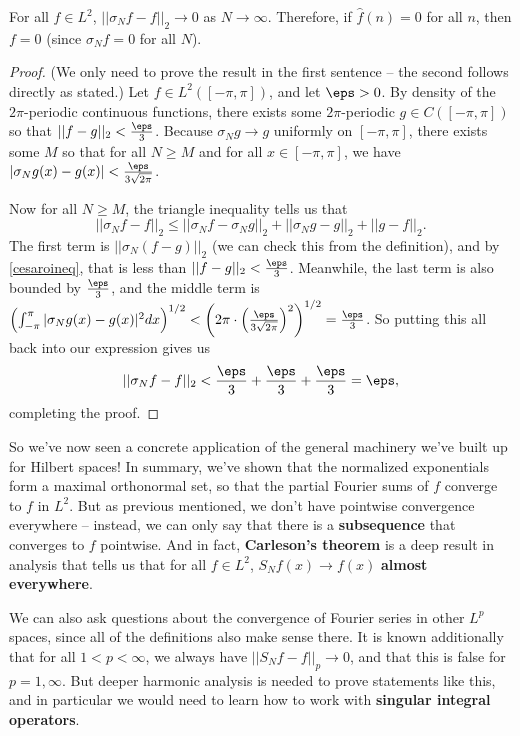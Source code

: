\begin{theorem}
For all $f \in L^2$, $||\sigma_N f - f||_2 \to 0$ as $N \to \infty$. Therefore, if $\hat{f}(n) = 0$ for all $n$, then $f = 0$ (since $\sigma_N f = 0$ for all $N$).
\end{theorem}
\begin{proof}
(We only need to prove the result in the first sentence -- the second follows directly as stated.) Let $f \in L^2([-\pi, \pi])$, and let $\eps > 0$. By density of the $2\pi$-periodic continuous functions, there exists some $2\pi$-periodic $g \in C([-\pi, \pi])$ so that $||f-g||_2 < \frac{\eps}{3}$. Because $\sigma_N g \to g$ uniformly on $[-\pi, \pi]$, there exists some $M$ so that for all $N \ge M$ and for all $x \in [-\pi, \pi]$, we have $|\sigma_Ng(x) - g(x)| < \frac{\eps}{3\sqrt{2\pi}}$.  

Now for all $N \ge M$, the triangle inequality tells us that
\[
    ||\sigma_Nf - f||_2 \le ||\sigma_N f - \sigma_N g||_2 + ||\sigma_N g - g||_2 + ||g - f||_2.
\]
The first term is $||\sigma_N(f-g)||_2$ (we can check this from the definition), and by \cref{cesaroineq}, that is less than $||f-g||_2 < \frac{\eps}{3}$. Meanwhile, the last term is also bounded by $\frac{\eps}{3}$, and the middle term is $\left(\int_{-\pi}^{\pi} |\sigma_N g(x) - g(x) |^2 dx \right)^{1/2} < \left(2\pi \cdot\left(\frac{\eps}{3\sqrt{2\pi}}\right)^2\right)^{1/2} = \frac{\eps}{3}$. So putting this all back into our expression gives us
\[
     ||\sigma_Nf - f||_2 < \frac{\eps}{3} + \frac{\eps}{3} + \frac{\eps}{3} = \eps,
\]
completing the proof.
\end{proof}

So we've now seen a concrete application of the general machinery we've built up for Hilbert spaces! In summary, we've shown that the normalized exponentials form a maximal orthonormal set, so that the partial Fourier sums of $f$ converge to $f$ in $L^2$. But as previous mentioned, we don't have pointwise convergence everywhere -- instead, we can only say that there is a \textbf{subsequence} that converges to $f$ pointwise. And in fact, \textbf{Carleson's theorem }is a deep result in analysis that tells us that for all $f \in L^2$, $S_Nf(x) \to f(x)$ \textbf{almost everywhere}.

We can also ask questions about the convergence of Fourier series in other $L^p$ spaces, since all of the definitions also make sense there. It is known additionally that for all $1 < p < \infty$, we always have $||S_N f - f||_p \to 0$, and that this is false for $p = 1, \infty$. But deeper harmonic analysis is needed to prove statements like this, and in particular we would need to learn how to work with \textbf{singular integral operators}.

